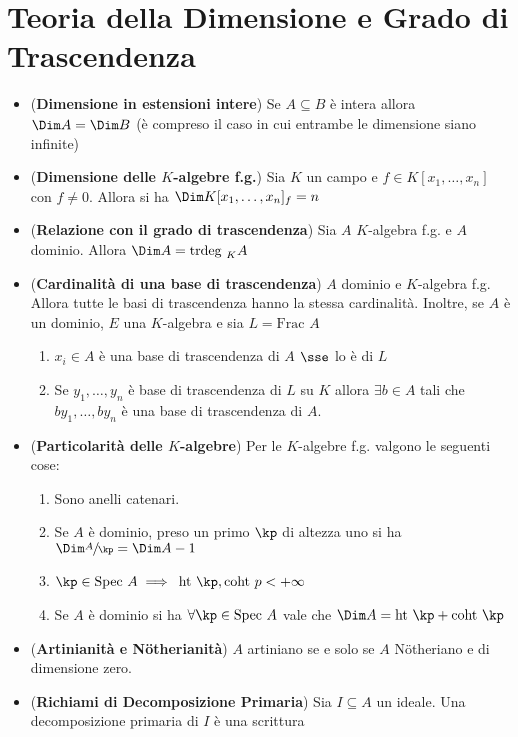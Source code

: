 \documentclass[a4paper,NoNotes,GeneralMath]{stdmdoc}
\newcommand{\Ht}{\text{ht }}
\newcommand{\Coht}{\text{coht }}
\newcommand{\Frac}{\text{Frac }}
\newcommand{\Spec}{\text{Spec }}
\newcommand{\trdeg}{\text{trdeg }}
\begin{document}
\section*{Teoria della Dimensione e Grado di Trascendenza}
\begin{itemize}
\item ({\bf Dimensione in estensioni intere}) Se $A \subseteq B$ è
  intera allora $\Dim A = \Dim B$ (è compreso il caso in cui entrambe le
  dimensione siano infinite)
\item ({\bf Dimensione delle $K$-algebre f.g.}) Sia $K$ un campo e
  $f \in K[x_1, \ldots, x_n]$ con $f \neq 0$. Allora si ha
  $\Dim K[x_1, \ldots, x_n]_f = n$
\item ({\bf Relazione con il grado di trascendenza}) Sia $A$ $K$-algebra
  f.g. e $A$ dominio. Allora $\Dim A = \trdeg_K A$
\item ({\bf Cardinalità di una base di trascendenza}) $A$ dominio e
  $K$-algebra f.g. Allora tutte le basi di trascendenza hanno la stessa
  cardinalità. \newline
  Inoltre, se $A$ è un dominio, $E$ una $K$-algebra e sia $L = \Frac A$
  \begin{enumerate}
  \item $x_i \in A$ è una base di trascendenza di $A$ $\sse$ lo è di $L$
  \item Se $y_1, \ldots, y_n$ è base di trascendenza di $L$ su $K$
    allora $\exists b \in A$ tali che $by_1, \ldots, by_n$ è una base di
    trascendenza di $A$.
  \end{enumerate}
\item ({\bf Particolarità delle $K$-algebre}) Per le $K$-algebre
  f.g. valgono le seguenti cose:
  \begin{enumerate}
  \item Sono anelli catenari.
  \item Se $A$ è dominio, preso un primo $\kp$ di altezza uno si ha
    $\Dim \sfrac{A}{\kp} = \Dim A - 1$
  \item $\kp \in \Spec A \implies $ $\Ht \kp, \Coht p < + \infty$
  \item Se $A$ è dominio si ha $\forall \kp \in \Spec A$ vale che
    $\Dim A = \Ht \kp + \Coht \kp$
  \end{enumerate}
\item ({\bf Artinianità e Nötherianità}) $A$ artiniano se e solo se $A$
  Nötheriano e di dimensione zero.
\item ({\bf Richiami di Decomposizione Primaria}) Sia $I \subseteq A$ un
  ideale. Una decomposizione primaria di $I$ è una scrittura

\end{itemize}
\end{document}
